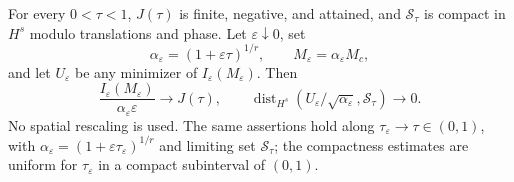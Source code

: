 \begin{proposition}
\label{prop:r10-crossover}
For every $0<\tau<1$, $J(\tau)$ is finite, negative, and attained, and
$\mathcal S_\tau$ is compact in $H^s$ modulo translations and phase.
Let $\varepsilon\downarrow0$, set
\[
 \alpha_\varepsilon=(1+\varepsilon\tau)^{1/r},\qquad
 M_\varepsilon=\alpha_\varepsilon M_c,
\]
and let $U_\varepsilon$ be any minimizer of
$I_\varepsilon(M_\varepsilon)$. Then
\[
 \frac{I_\varepsilon(M_\varepsilon)}
             {\alpha_\varepsilon\varepsilon}\longrightarrow J(\tau),
 \qquad
 \operatorname{dist}_{H^s}
       (U_\varepsilon/\sqrt{\alpha_\varepsilon},\mathcal S_\tau)
       \longrightarrow0.
\]
No spatial rescaling is used. The same assertions hold along
$\tau_\varepsilon\to\tau\in(0,1)$, with
$\alpha_\varepsilon=(1+\varepsilon\tau_\varepsilon)^{1/r}$ and limiting
set $\mathcal S_\tau$; the compactness estimates are uniform for
$\tau_\varepsilon$ in a compact subinterval of $(0,1)$.
\end{proposition}

